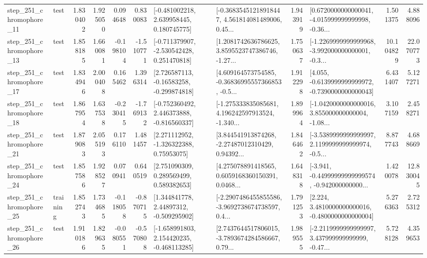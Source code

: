 \begin{tabular}{llrrrrllrlrr}
  step\_251\_chromophore\_11 &      test &      1.830402 &    1.925050 &      0.094648 &  0.830083 &    [-0.481002218, 2.639958445, 0.180745775] &  [-0.36835451218918447, 4.561814081489006, 0.45... &       1.943919 &  [0.6720000000000041, -4.015999999999998, -0.36... &            1.501375 &          4.888096 \\
  step\_251\_chromophore\_13 &      test &      1.858185 &    1.660081 &     -0.198104 & -1.510771 &   [-0.711379907, -2.530542428, 0.251470818] &  [1.2081742636786625, 3.8595523747386746, -1.27... &       1.750637 &  [-1.2269999999999968, -3.992000000000001, -0.3... &           10.104829 &         22.070773 \\
  step\_251\_chromophore\_17 &      test &      1.834946 &    2.000408 &      0.165462 &  1.396314 &    [2.726587113, -0.16583258, -0.299874818] &  [4.609164573754585, -0.36836995557366853, -0.5... &       1.912298 &  [4.055, -0.6139999999999972, -0.7390000000000043] &            6.431407 &          5.127271 \\
  step\_251\_chromophore\_18 &      test &      1.867954 &    1.637538 &     -0.230415 & -1.769132 &   [-0.752360492, 2.446373888, -0.816560337] &  [-1.275333835085681, 4.196242597913524, -1.340... &       1.899964 &  [-1.0420000000000016, 3.855000000000004, -1.08... &            3.107159 &          2.458271 \\
  step\_251\_chromophore\_21 &      test &      1.879083 &    2.055193 &      0.176110 &  1.481457 &     [2.271112952, -1.326322388, 0.75953075] &  [3.844541913874268, -2.27487012310429, 0.94392... &       1.846462 &  [-3.5389999999999997, 2.1199999999999974, -0.5... &            8.877743 &          4.688669 \\
  step\_251\_chromophore\_24 &      test &      1.857586 &    1.928527 &      0.070941 &  0.640519 &     [2.751090309, 0.289569499, 0.589382653] &  [4.275078891418565, 0.6059168360150391, 0.0468... &       1.648318 &  [-3.941, -0.44999999999999574, -0.942000000000... &            1.420078 &         12.830045 \\
  step\_251\_chromophore\_25 &  training &      1.852743 &    1.734685 &     -0.118058 & -0.870715 &     [1.344841778, 2.44897312, -0.509295902] &  [-2.2907486455855586, -3.9692738674738597, 0.4... &       1.791253 &   [2.224, 3.4810000000000016, -0.4800000000000004] &            5.276363 &          2.725312 \\
  step\_251\_chromophore\_26 &      test &      1.910186 &    1.829635 &     -0.080551 & -0.570808 &   [-1.658991803, 2.154420235, -0.468113285] &  [2.7437644517806015, -3.7893674284586667, 0.79... &       1.989555 &  [-2.2119999999999997, 3.437999999999999, -0.47... &            5.728128 &          4.359653 \\

\end{tabular}

